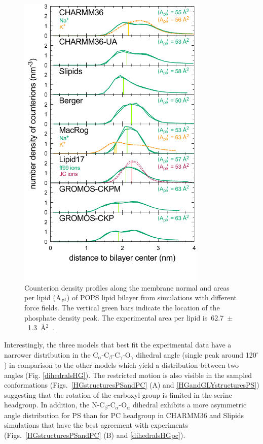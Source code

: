\documentclass[aps,prl,superscriptaddress,twocolumn]{revtex4}
\begin{document}
\begin{figure}[!htb]
  \centering
  \includegraphics[width=9.0cm]{../Figs/NAdensPOPSformatted.pdf}
  \caption{\label{NAdensPOPS}
    Counterion density profiles along the membrane normal and areas per lipid (A$_{\rm pl}$)
    of POPS lipid bilayer from simulations with different force fields.
    The vertical green bars indicate the location of the phosphate density peak.
    The experimental area per lipid is~62.7~$\pm$~1.3~\AA$^2$~\cite{pan14}.
  }
\end{figure}


Interestingly, the three models that best fit the experimental data have a narrower distribution in the C$_\alpha$-C$_\beta$-C$_\gamma$-O$_\gamma$
dihedral angle (single peak around 120$^{\circ}$) in comparison to the other models which yield a distribution between two angles (Fig. \ref{dihedralsHG}).
The restricted motion is also visible in the sampled conformations (Figs.~\ref{HGstructuresPSandPC} (A) and \ref{HGandGLYstructuresPS})
suggesting that the rotation of the carboxyl group is limited in the serine headgroup.
In addition, the N-C$_\beta$-C$_\alpha$-O$_\alpha$ dihedral exhibits a more asymmetric
angle distribution for PS than for PC headgroup in
CHARMM36 and Slipids simulations that have the best agreement with experiments
(Figs.~\ref{HGstructuresPSandPC} (B) and \ref{dihedralsHGpc}).
\end{document}
